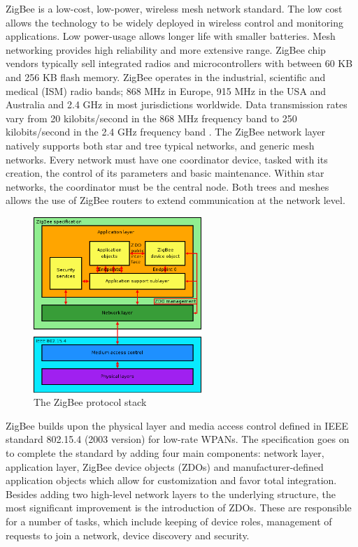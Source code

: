 \documentclass[conference]{IEEEtran}
\begin{document}
ZigBee is a low-cost, low-power, wireless mesh network standard. 
The low cost allows the technology to be widely deployed in wireless control and monitoring applications. 
Low power-usage allows longer life with smaller batteries. 
Mesh networking provides high reliability and more extensive range. 
ZigBee chip vendors typically sell integrated radios and microcontrollers with between 60 KB and 256 KB flash memory.
ZigBee operates in the industrial, scientific and medical (ISM) radio bands; 868 MHz in Europe, 915 MHz in the USA and Australia and 2.4 GHz in most jurisdictions worldwide. 
Data transmission rates vary from 20 kilobits/second in the 868 MHz frequency band to 250 kilobits/second in the 2.4 GHz frequency band \cite{wikiwsn}.
The ZigBee network layer natively supports both star and tree typical networks, and generic mesh networks.
 Every network must have one coordinator device, tasked with its creation, the control of its parameters and basic maintenance. 
Within star networks, the coordinator must be the central node.
 Both trees and meshes allows the use of ZigBee routers to extend communication at the network level.

\begin{figure}[!t]
\centering
\includegraphics[width=2.5in]{images/ZigBee_protocol_stack.png}
\caption{The ZigBee protocol stack}
\label{zigbee}
\end{figure}


ZigBee builds upon the physical layer and media access control defined in IEEE standard 802.15.4 (2003 version) for low-rate WPANs. 
The specification goes on to complete the standard by adding four main components: network layer, application layer, ZigBee device objects (ZDOs) and manufacturer-defined application objects which allow for customization and favor total integration.
Besides adding two high-level network layers to the underlying structure, the most significant improvement is the introduction of ZDOs.
 These are responsible for a number of tasks, which include keeping of device roles, management of requests to join a network, device discovery and security.
\end{document}
